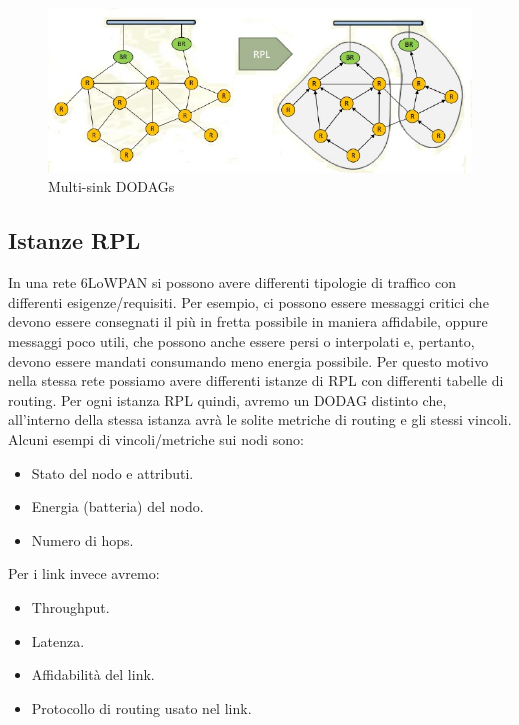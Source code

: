 \documentclass{article}
\begin{document}
\begin{figure}[H]
\centering
\includegraphics[scale=0.4]{figures/dodag.jpg}
\caption{Multi-sink DODAGs}
\end{figure}
\subsection{Istanze RPL}
In una rete 6LoWPAN si possono avere differenti tipologie di traffico con differenti esigenze/requisiti. Per esempio, ci possono essere messaggi critici che devono essere consegnati il più in fretta possibile in maniera affidabile, oppure messaggi poco utili, che possono anche essere persi o interpolati e, pertanto, devono essere mandati consumando meno energia possibile.
Per questo motivo nella stessa rete possiamo avere differenti istanze di RPL con differenti tabelle di routing. Per ogni istanza RPL quindi, avremo un DODAG distinto che, all'interno della stessa istanza avrà le solite metriche di routing e gli stessi vincoli. Alcuni esempi di vincoli/metriche sui nodi sono:
\begin{itemize}
    \item Stato del nodo e attributi.
    \item Energia (batteria) del nodo.
    \item Numero di hops.
\end{itemize}
Per i link invece avremo:
\begin{itemize}
    \item Throughput.
    \item Latenza.
    \item Affidabilità del link.
    \item Protocollo di routing usato nel link.
\end{itemize}
\end{document}
